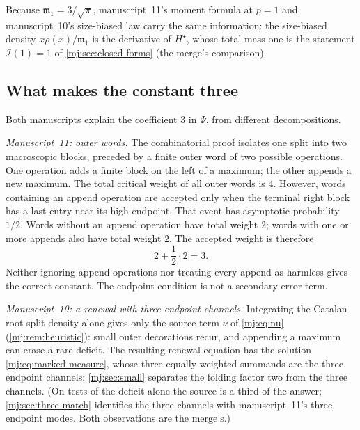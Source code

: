 \documentclass[11pt,a4paper]{article}
\theoremstyle{definition}\newaliascnt{definition}{theorem}
\theoremstyle{remark}\newaliascnt{remark}{theorem}
\begin{document}
Because $\mathfrak m_1=3/\sqrt\pi$, manuscript~11's moment formula at $p=1$
and manuscript~10's size-biased law carry the same information: the
size-biased density $x\rho(x)/\mathfrak m_1$ is the derivative of
$H^\star$, whose total mass one is the statement $\mathcal I(1)=1$ of
\cref{mj:sec:closed-forms} (the merge's comparison).

\subsection{What makes the constant three}
\label{mj:sec:three}
Both manuscripts explain the coefficient $3$ in $\Psi$, from different
decompositions.

\emph{Manuscript~11: outer words.} The combinatorial proof isolates one
split into two macroscopic blocks, preceded by a finite outer word of two
possible operations. One operation adds a finite block on the left of a
maximum; the other appends a new maximum. The total critical weight of all
outer words is $4$. However, words containing an append operation are
accepted only when the terminal right block has a last entry near its high
endpoint. That event has asymptotic probability $1/2$. Words without an
append operation have total weight $2$; words with one or more appends also
have total weight $2$. The accepted weight is therefore
\begin{equation}
 2+\frac12\cdot2=3.
 \label{mj:eq:three-intro}
\end{equation}
Neither ignoring append operations nor treating every append as harmless
gives the correct constant. The endpoint condition is not a secondary error
term.

\emph{Manuscript~10: a renewal with three endpoint channels.} Integrating
the Catalan root-split density alone gives only the source term $\nu$ of
\eqref{mj:eq:nu} (\cref{mj:rem:heuristic}): small outer decorations recur,
and appending a maximum can erase a rare deficit. The resulting renewal
equation has the solution \eqref{mj:eq:marked-measure}, whose three equally
weighted summands are the three endpoint channels; \cref{mj:sec:small}
separates the folding factor two from the three channels. (On tests of the
deficit alone the source is a third of the answer; \cref{mj:sec:three-match}
identifies the three channels with manuscript~11's three endpoint modes. Both
observations are the merge's.)
\end{document}
